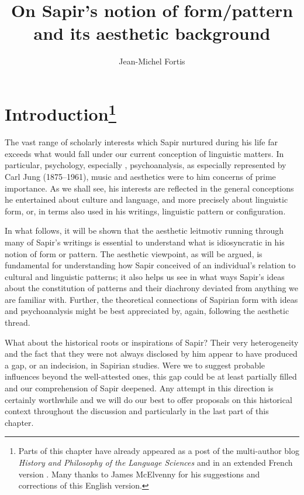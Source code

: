 \documentclass[output=paper]{langscibook}
\author{Jean-Michel Fortis\affiliation{\textsc{cnrs}, Université Paris Diderot}}
\title{On Sapir's notion of form/pattern and its aesthetic background}
\begin{document}
\maketitle

\section{Introduction\protect\footnote{Parts of this chapter have already appeared as a post of the multi-author blog \emph{History and Philosophy of the Language Sciences} \citep{Fortis2014} and in an extended French version \citep{Fortis2015}. Many thanks to James McElvenny for his suggestions and corrections of this English version. }}
\label{sec:fotis:intro}

The vast range of scholarly interests which Sapir nurtured during his life far exceeds what would fall under our current conception of linguistic matters. In particular, psychology, especially , psychoanalysis, as especially represented by Carl Jung (1875--1961), music and aesthetics were to him concerns of prime importance. As we shall see, his interests are reflected in the general conceptions he entertained about culture and language, and more precisely about linguistic form, or, in terms also used in his writings, linguistic pattern or configuration.

In what follows, it will be shown that the aesthetic leitmotiv running  through many of Sapir's writings is essential to understand what is idiosyncratic in his notion of form or pattern. The aesthetic viewpoint, as will be argued, is fundamental for understanding how Sapir conceived of an individual's relation to cultural and linguistic patterns; it also helps us see in what ways Sapir's ideas about the constitution of patterns and their diachrony deviated from anything we are familiar with. Further, the theoretical connections of Sapirian form with  ideas and psychoanalysis might be best appreciated by, again, following the aesthetic thread.

What about the historical roots or inspirations of Sapir? Their very heterogeneity and the fact that they were not always disclosed by him appear to have produced a gap, or an indecision, in Sapirian studies. Were we to suggest probable influences beyond the well-attested ones, this gap could be at least partially filled and our comprehension of Sapir deepened. Any attempt in this direction is certainly worthwhile and we will do our best to offer proposals on this historical context throughout the discussion and particularly in the last part of this chapter.
\end{document}
